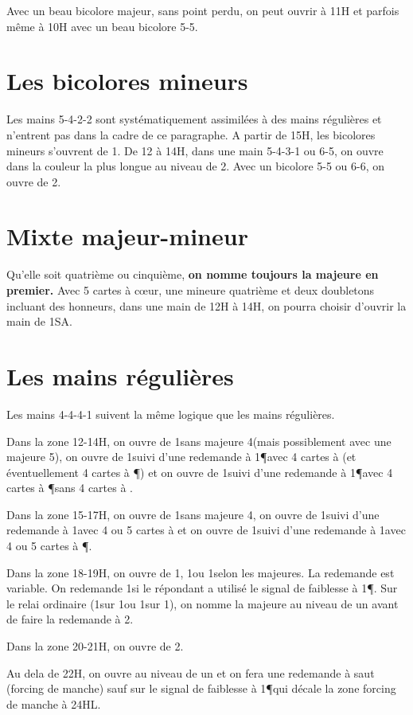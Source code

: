 \begin{multicols}{2}
Avec un beau bicolore majeur, sans point perdu, on peut ouvrir à 11H et parfois même à 10H avec un beau bicolore 5-5.


\section*{Les bicolores mineurs}

Les mains 5-4-2-2 sont systématiquement assimilées à des mains régulières et n'entrent pas dans la cadre de ce paragraphe.
A partir de 15H, les bicolores mineurs s'ouvrent de 1\C.
De 12 à 14H, dans une main 5-4-3-1 ou 6-5, on ouvre dans la couleur la plus longue au niveau de 2.
Avec un bicolore 5-5 ou 6-6, on ouvre de 2\K.

\section*{Mixte majeur-mineur}

Qu'elle soit quatrième ou cinquième, \textbf{on nomme toujours la majeure en premier.}
Avec 5 cartes à cœur, une mineure quatrième et deux doubletons incluant des honneurs, dans une main de 12H à 14H, on pourra choisir d'ouvrir la main de 1SA.

\section*{Les mains régulières}

Les mains 4-4-4-1 suivent la même logique que les mains régulières.

Dans la zone 12-14H, on ouvre de 1\NT sans majeure 4\ieme (mais possiblement avec une majeure 5\ieme), on ouvre de 1\T suivi d'une redemande à 1\P avec 4 cartes à \C (et éventuellement 4 cartes à \P) et on ouvre de 1\K suivi d'une redemande à 1\P avec 4 cartes à \P sans 4 cartes à \C.

Dans la zone 15-17H, on ouvre de 1\C sans majeure 4\ieme, on ouvre de 1\T suivi d'une redemande à 1\NT avec 4 ou 5 cartes à \C et on ouvre de 1\K suivi d'une redemande à 1\NT avec 4 ou 5 cartes à \P.

Dans la zone 18-19H, on ouvre de 1\T, 1\K ou 1\C selon les majeures. La redemande est variable. On redemande 1\NT si le répondant a utilisé le signal de faiblesse à 1\P. Sur le relai ordinaire (1\K sur 1\T ou 1\C sur 1\K), on nomme la majeure au niveau de un avant de faire la redemande à 2\NT.

Dans la zone 20-21H, on ouvre de 2\NT.

Au dela de 22H, on ouvre au niveau de un et on fera une redemande à saut (forcing de manche) sauf sur le signal de faiblesse à 1\P qui décale la zone forcing de manche à 24HL.
\end{multicols}


